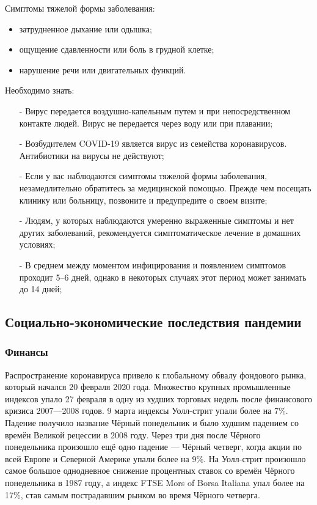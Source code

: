 \documentclass[a4paper, 12pt]{extarticle}
\begin{document}
\vspace{5mm}

Симптомы тяжелой формы заболевания:
\begin{itemize}
    \item затрудненное дыхание или одышка;
    \item ощущение сдавленности или боль в грудной клетке;
    \item нарушение речи или двигательных функций.
\end{itemize}

\vspace{5mm}

Необходимо знать:
\begin{itemize}
    \item[-] Вирус передается воздушно-капельным путем и при непосредственном
        контакте людей. Вирус не передается через воду или при плавании;
    \item[-] Возбудителем COVID-19 является вирус из семейства коронавирусов.
        Антибиотики на вирусы не действуют;
    \item[-] Если у вас наблюдаются симптомы тяжелой формы заболевания,
        незамедлительно обратитесь за медицинской помощью. Прежде чем посещать
        клинику или больницу, позвоните и предупредите о своем визите;
    \item[-] Людям, у которых наблюдаются умеренно выраженные симптомы и нет
        других заболеваний, рекомендуется симптоматическое лечение в домашних
        условиях;
    \item[-] В среднем между моментом инфицирования и появлением симптомов
        проходит 5–6 дней, однако в некоторых случаях этот период может
        занимать до 14 дней;
\end{itemize}

\newpage

\subsection{Социально-экономические последствия пандемии}
\subsubsection{Финансы}

Распространение коронавируса привело к глобальному обвалу фондового рынка,
который начался 20 февраля 2020 года. Множество крупных промышленные индексов
упало 27 февраля в одну из худших торговых недель после финансового кризиса
2007—2008 годов. 9 марта индексы Уолл-стрит упали более на 7\%. Падение
получило название Чёрный понедельник и было худшим падением со времён Великой
рецессии в 2008 году. Через три дня после Чёрного понедельника произошло ещё
одно падение — Чёрный четверг, когда акции по всей Европе и Северной Америке
упали более на 9\%. На Уолл-стрит произошло самое большое однодневное снижение
процентных ставок со времён Чёрного понедельника в 1987 году, а индекс FTSE
Mors of Borsa Italiana упал более на 17\%, став самым пострадавшим рынком во время Чёрного четверга.
\end{document}
